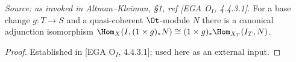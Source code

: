 \begin{theorem}
  \label{thm:ega_adjunction}
  \mathlibok
  \textit{Source: as invoked in Altman--Kleiman, §1, ref [EGA O$_I$, 4.4.3.1].}
  For a base change $g : T \to S$ and a quasi-coherent $\Ot$-module $N$ there is a
  canonical adjunction isomorphism
  $\Hom_X(I, (1\times g)_* N) \cong (1\times g)_* \Hom_{X_T}(I_T, N)$.
  \begin{proof}
    Established in [EGA O$_I$, 4.4.3.1]; used here as an external input.
  \end{proof}
\end{theorem}


